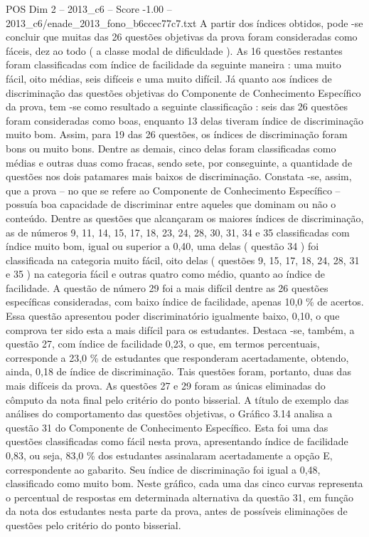 \begin{textsample}{POS Dim 2 – 2013\_c6 – Score -1.00 – 2013\_c6/enade\_2013\_fono\_b6ccec77c7.txt}
A partir dos índices obtidos, pode -se concluir que muitas das 26 questões objetivas da prova foram consideradas como fáceis, dez ao todo ( a classe modal de dificuldade ).
As 16 questões restantes foram classificadas com índice de facilidade da seguinte maneira : uma muito fácil, oito médias, seis difíceis e uma muito difícil.
Já quanto aos índices de discriminação das questões objetivas do Componente de Conhecimento Específico da prova, tem -se como resultado a seguinte classificação : seis das 26 questões foram consideradas como boas, enquanto 13 delas tiveram índice de discriminação muito bom.
Assim, para 19 das 26 questões, os índices de discriminação foram bons ou muito bons.
Dentre as demais, cinco delas foram classificadas como médias e outras duas como fracas, sendo sete, por conseguinte, a quantidade de questões nos dois patamares mais baixos de discriminação.
Constata -se, assim, que a prova – no que se refere ao Componente de Conhecimento Específico – possuía boa capacidade de discriminar entre aqueles que dominam ou não o conteúdo.
Dentre as questões que alcançaram os maiores índices de discriminação, as de números 9, 11, 14, 15, 17, 18, 23, 24, 28, 30, 31, 34 e 35 classificadas com índice muito bom, igual ou superior a 0,40, uma delas ( questão 34 ) foi classificada na categoria muito fácil, oito delas ( questões 9, 15, 17, 18, 24, 28, 31 e 35 ) na categoria fácil e outras quatro como médio, quanto ao índice de facilidade.
A questão de número 29 foi a mais difícil dentre as 26 questões específicas consideradas, com baixo índice de facilidade, apenas 10,0 \% de acertos.
Essa questão apresentou poder discriminatório igualmente baixo, 0,10, o que comprova ter sido esta a mais difícil para os estudantes.
Destaca -se, também, a questão 27, com índice de facilidade 0,23, o que, em termos percentuais, corresponde a 23,0 \% de estudantes que responderam acertadamente, obtendo, ainda, 0,18 de índice de discriminação.
Tais questões foram, portanto, duas das mais difíceis da prova.
As questões 27 e 29 foram as únicas eliminadas do cômputo da nota final pelo critério do ponto bisserial.
A título de exemplo das análises do comportamento das questões objetivas, o Gráfico 3.14 analisa a questão 31 do Componente de Conhecimento Específico.
Esta foi uma das questões classificadas como fácil nesta prova, apresentando índice de facilidade 0,83, ou seja, 83,0 \% dos estudantes assinalaram acertadamente a opção E, correspondente ao gabarito.
Seu índice de discriminação foi igual a 0,48, classificado como muito bom.
Neste gráfico, cada uma das cinco curvas representa o percentual de respostas em determinada alternativa da questão 31, em função da nota dos estudantes nesta parte da prova, antes de possíveis eliminações de questões pelo critério do ponto bisserial.

\end{textsample}
